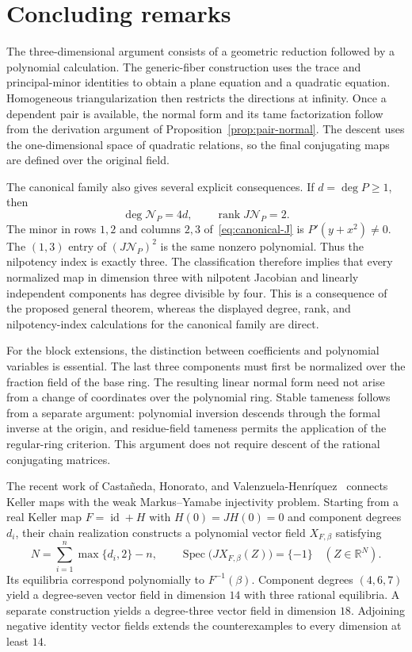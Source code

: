 \documentclass[11pt,reqno]{amsart}
\theoremstyle{definition}
\theoremstyle{remark}
\numberwithin{equation}{section}
\DeclareMathOperator{\rank}{rank}
\DeclareMathOperator{\id}{id}
\newcommand{\Ncal}{\mathcal N}
\begin{document}
\section{Concluding remarks}\label{sec:conclusion}

The three-dimensional argument consists of a geometric reduction followed by a polynomial calculation. The generic-fiber construction uses the trace and principal-minor identities to obtain a plane equation and a quadratic equation. Homogeneous triangularization then restricts the directions at infinity. Once a dependent pair is available, the normal form and its tame factorization follow from the derivation argument of Proposition~\ref{prop:pair-normal}. The descent uses the one-dimensional space of quadratic relations, so the final conjugating maps are defined over the original field.

The canonical family also gives several explicit consequences. If $d=\deg P\geq1$, then
\[
 \deg\Ncal_P=4d,\qquad \rank J\Ncal_P=2.
\]
The minor in rows $1,2$ and columns $2,3$ of~\eqref{eq:canonical-J} is $P'(y+x^2)\neq0$. The $(1,3)$ entry of $(J\Ncal_P)^2$ is the same nonzero polynomial. Thus the nilpotency index is exactly three. The classification therefore implies that every normalized map in dimension three with nilpotent Jacobian and linearly independent components has degree divisible by four. This is a consequence of the proposed general theorem, whereas the displayed degree, rank, and nilpotency-index calculations for the canonical family are direct.

For the block extensions, the distinction between coefficients and polynomial variables is essential. The last three components must first be normalized over the fraction field of the base ring. The resulting linear normal form need not arise from a change of coordinates over the polynomial ring. Stable tameness follows from a separate argument: polynomial inversion descends through the formal inverse at the origin, and residue-field tameness permits the application of the regular-ring criterion. This argument does not require descent of the rational conjugating matrices.

The recent work of Casta{\~n}eda, Honorato, and Valenzuela-Henr{\'i}quez~\cite[Theorems~1.2, 5.1, and~8.1]{CHV2026} connects Keller maps with the weak Markus--Yamabe injectivity problem. Starting from a real Keller map $F=\id+H$ with $H(0)=JH(0)=0$ and component degrees $d_i$, their chain realization constructs a polynomial vector field $X_{F,\beta}$ satisfying
\[
 N=\sum_{i=1}^{n}\max\{d_i,2\}-n,
 \qquad
 \operatorname{Spec}\bigl(JX_{F,\beta}(Z)\bigr)=\{-1\}
 \quad (Z\in\mathbb R^N).
\]
Its equilibria correspond polynomially to $F^{-1}(\beta)$. Component degrees $(4,6,7)$ yield a degree-seven vector field in dimension $14$ with three rational equilibria. A separate construction yields a degree-three vector field in dimension $18$. Adjoining negative identity vector fields extends the counterexamples to every dimension at least $14$.
\end{document}
